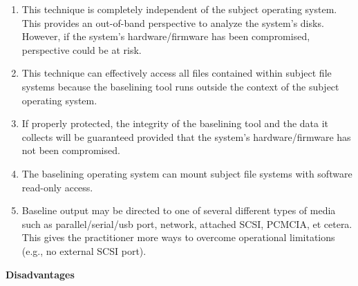 \documentclass[10pt]{article}
\begin{document}
\begin{enumerate}

  \item
  This technique is completely independent of the subject operating
  system.  This provides an out-of-band perspective to analyze the
  system's disks.  However, if the system's hardware/firmware has
  been compromised, perspective could be at risk.

  \item
  This technique can effectively access all files contained within
  subject file systems because the baselining tool runs outside
  the context of the subject operating system.

  \item
  If properly protected, the integrity of the baselining tool and
  the data it collects will be guaranteed provided that the system's
  hardware/firmware has not been compromised.

  \item
  The baselining operating system can mount subject file systems
  with software read-only access.

  \item
  Baseline output may be directed to one of several different types
  of media such as parallel/serial/usb port, network, attached
  SCSI, PCMCIA, et cetera.  This gives the practitioner more ways
  to overcome operational limitations (e.g., no external SCSI port).

\end{enumerate}

  \textbf{Disadvantages}
\end{document}
